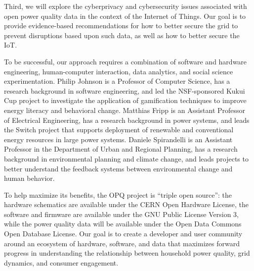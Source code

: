 Third, we will explore the cyberprivacy and cybersecurity issues associated with open power quality data in the context of the Internet of Things.  Our goal is to provide evidence-based recommendations for how to better secure the grid to prevent disruptions based upon such data, as well as how to better secure the IoT.

To be successful, our approach requires a combination of software and hardware engineering, human-computer interaction, data analytics, and social science experimentation.  Philip Johnson is a Professor of Computer Science, has a research background in software engineering, and led the NSF-sponsored Kukui Cup project \cite{kukuicup} to investigate the application of gamification techniques to improve energy literacy and behavioral change. Matthias Fripp is an Assistant Professor of Electrical Engineering, has a research background in power systems, and leads the Switch project \cite{switch} that supports deployment of renewable and conventional energy resources in large power systems. Daniele Spirandelli is an Assistant Professor in the Department of Urban and Regional Planning, has a research background in environmental planning and climate change, and leads projects to better understand the feedback systems between environmental change and human behavior. 

To help maximize its benefits, the OPQ project is ``triple open source'': the hardware schematics are available under the CERN Open Hardware License, the software and firmware are available under the GNU Public License Version 3, while the power quality data will be available under the Open Data Commons Open Database License.  Our goal is to create a developer and user community around an ecosystem of hardware, software, and data that maximizes forward progress in understanding the relationship between household power quality, grid dynamics, and consumer engagement.






